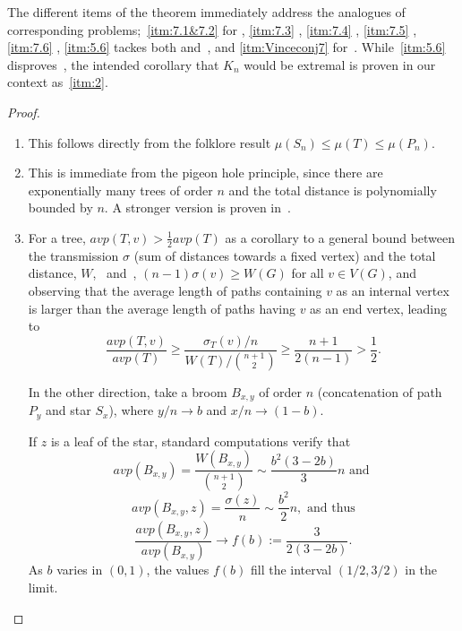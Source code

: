 \documentclass[a4paper,11pt]{article}
\newcommand*{\avp}{avp}
\begin{document}
The different items of the theorem immediately address the analogues of corresponding problems;~\cref{itm:7.1&7.2} for \cite[Prob.~(7.1) \& (7.2)]{jamison_average_1983}, \cref{itm:7.3} \cite[Prob.~(7.3)]{jamison_average_1983}, \cref{itm:7.4} \cite[Prob.~(7.4)]{jamison_average_1983}, \cref{itm:7.5} \cite[Prob.~(7.5)]{jamison_average_1983}, \cref{itm:7.6} \cite[Prob.~(7.6)]{jamison_average_1983}, \cref{itm:5.6} tackes both \cite[Conj.~5.6]{jamison_monotonicity_1984} and~\cite[Conj.~7.4]{CGMV18}, and
\cref{itm:Vinceconj7} for~\cite[Conj. 7]{Vince20}.
While~\cref{itm:5.6} disproves~\cite[Conj.~5]{CGMV18}, the intended corollary that $K_n$ would be extremal is proven in our context as~\cref{itm:2}. 
 


\begin{proof}
\begin{enumerate}
    \item %
    This follows directly from the folklore result $\mu(S_n) \le \mu(T) \le \mu(P_n)$.
    \item This is immediate from the pigeon hole principle, since there are exponentially many trees of order $n$ and the total distance is polynomially bounded by $n.$ A stronger version is proven in~\cite[cor.~1]{WW14}. 
    \item For a tree, $\avp(T, v) > \frac 12 \avp(T)$ as a corollary to a general bound between the transmission  $\sigma$ (sum of distances towards a fixed vertex) and the total distance, $W$,~\cite[Thm.~2.1]{HK14} and~\cite[Lem.~26]{CD25}, $(n-1)\sigma(v) \ge W(G)$ for all $v \in V(G)$, and observing that the average length of paths containing $v$ as an internal vertex is larger than the average length of paths having $v$ as an end vertex, leading to
    \[
 \frac{\avp(T,v)}{\avp(T)}
 \geq
 \frac{\sigma_T(v)/n}{W(T)/\binom{n+1}{2}}
 \geq \frac{n+1}{2(n-1)}
 >\frac12.
\]

    
    In the other direction, take a broom $B_{x,y}$ of order $n$ (concatenation of path $P_{y}$ and star $S_{x}$), where $y/n \to b$ and $x/n \to (1-b).$
    
    If $z$ is a leaf of the star, standard computations verify that
\[
 \avp(B_{x,y})
 =\frac{W(B_{x,y})}{\binom{n+1}{2}}
 \sim \frac{b^2(3-2b)}3n \mbox{ and }
\]
\[
 \avp(B_{x,y},z)=\frac{\sigma(z)}n
 \sim\frac{b^2}{2}n, \mbox{ and thus}
\]
\[
 \frac{\avp(B_{x,y},z)}{\avp(B_{x,y})}
 \longrightarrow
 f(b):=\frac{3}{2(3-2b)}.
\]
As $b$ varies in $(0,1)$, the values $f(b)$ fill the interval
$(1/2,3/2)$ in the limit.


\end{enumerate}
\end{proof}
\end{document}
